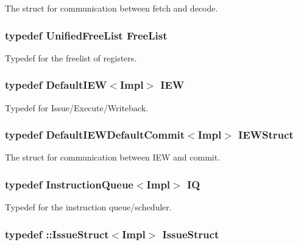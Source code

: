 \label{structSimpleCPUPolicy_a84cf84b07d04291ab6f09af9855f5e30}
The struct for communication between fetch and decode. \hypertarget{structSimpleCPUPolicy_a74a15704374ad611e569d99c3f99f3a4}{
\subsubsection[{FreeList}]{\setlength{\rightskip}{0pt plus 5cm}typedef {\bf UnifiedFreeList} {\bf FreeList}}}
\label{structSimpleCPUPolicy_a74a15704374ad611e569d99c3f99f3a4}
Typedef for the freelist of registers. \hypertarget{structSimpleCPUPolicy_a22056ac0bac160e601df2d04260100be}{
\subsubsection[{IEW}]{\setlength{\rightskip}{0pt plus 5cm}typedef {\bf DefaultIEW}$<$Impl$>$ {\bf IEW}}}
\label{structSimpleCPUPolicy_a22056ac0bac160e601df2d04260100be}
Typedef for Issue/Execute/Writeback. \hypertarget{structSimpleCPUPolicy_a4e10dd7f3721c1bd03793c428a739ee8}{
\subsubsection[{IEWStruct}]{\setlength{\rightskip}{0pt plus 5cm}typedef {\bf DefaultIEWDefaultCommit}$<$Impl$>$ {\bf IEWStruct}}}
\label{structSimpleCPUPolicy_a4e10dd7f3721c1bd03793c428a739ee8}
The struct for communication between IEW and commit. \hypertarget{structSimpleCPUPolicy_a88e5491f89e7e164d826eefd71d76267}{
\subsubsection[{IQ}]{\setlength{\rightskip}{0pt plus 5cm}typedef {\bf InstructionQueue}$<$Impl$>$ {\bf IQ}}}
\label{structSimpleCPUPolicy_a88e5491f89e7e164d826eefd71d76267}
Typedef for the instruction queue/scheduler. \hypertarget{structSimpleCPUPolicy_ad9127d90dae1796b4dd1f07421b1ef72}{
\subsubsection[{IssueStruct}]{\setlength{\rightskip}{0pt plus 5cm}typedef ::{\bf IssueStruct}$<$Impl$>$ {\bf IssueStruct}}}
